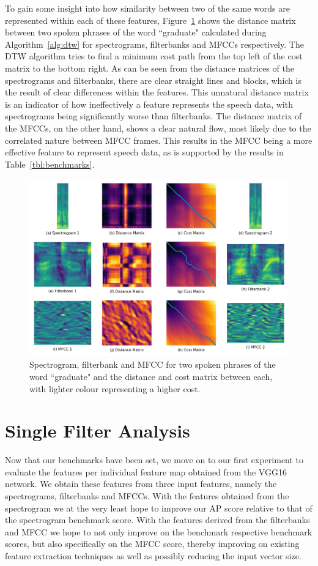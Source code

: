 To gain some insight into how similarity between two of the same words are represented within each of these features, Figure~\ref{fig:cost_matrix} shows the distance matrix between two spoken phrases of the word ``graduate" calculated during Algorithm~\ref{alg:dtw} for spectrograms, filterbanks and MFCCs respectively. 
The DTW algorithm tries to find a minimum cost path from the top left of the cost matrix to the bottom right. 
As can be seen from the distance matrices of the spectrograms and filterbanks, there are clear straight lines and blocks, which is the result of clear differences within the features.
This unnatural distance matrix is an indicator of how ineffectively a feature represents the speech data, with spectrograms being significantly worse than filterbanks.
The distance matrix of the MFCCs, on the other hand, shows a clear natural flow, most likely due to the correlated nature between MFCC frames.
This results in the MFCC being a more effective feature to represent speech data, as is supported by the results in Table~\ref{tbl:benchmarks}.

\begin{figure}[ht]
    \centering
    \includegraphics[width=0.9\linewidth]{content/fig/cost_matrices.png}
    \caption{Spectrogram, filterbank and MFCC for two spoken phrases of the word ``graduate" and the distance and cost matrix between each, with lighter colour representing a higher cost.}
    \label{fig:cost_matrix}
\end{figure}

\section{Single Filter Analysis}

Now that our benchmarks have been set, we move on to our first experiment to evaluate the features per individual feature map obtained from the VGG16 network. 
We obtain these features from three input features, namely the spectrograms, filterbanks and MFCCs.
With the features obtained from the spectrogram we at the very least hope to improve our AP score relative to that of the spectrogram benchmark score.
With the features derived from the filterbanks and MFCC we hope to not only improve on the benchmark respective benchmark scores, but also specifically on the MFCC score, thereby improving on existing feature extraction techniques as well as possibly reducing the input vector size.

